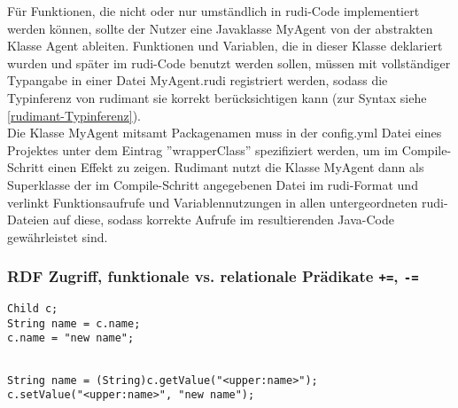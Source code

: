 Für Funktionen, die nicht oder nur umständlich in rudi-Code implementiert werden können, sollte der Nutzer eine Javaklasse MyAgent von der abstrakten Klasse Agent ableiten. Funktionen und Variablen, die in dieser Klasse deklariert wurden und später im rudi-Code benutzt werden sollen, müssen mit vollständiger Typangabe in einer Datei MyAgent.rudi registriert werden, sodass die Typinferenz von rudimant sie korrekt berücksichtigen kann (zur Syntax siehe \ref{rudimant-Typinferenz}).\\
Die Klasse MyAgent mitsamt Packagenamen muss in der config.yml Datei eines Projektes unter dem Eintrag ''wrapperClass'' spezifiziert werden, um im Compile-Schritt einen Effekt zu zeigen. Rudimant nutzt die Klasse MyAgent dann als Superklasse der im Compile-Schritt angegebenen Datei im rudi-Format und verlinkt Funktionsaufrufe und Variablennutzungen in allen untergeordneten rudi-Dateien auf diese, sodass korrekte Aufrufe im resultierenden Java-Code gewährleistet sind.

\subsubsection{RDF Zugriff, funktionale vs. relationale Prädikate
  \texttt{+=}, \texttt{-=}}

\begin{small}
\begin{minipage}[t]{0.35\textwidth}
\begin{verbatim}
Child c;
String name = c.name;
c.name = "new name";
\end{verbatim}
\end{minipage}
\begin{minipage}[t]{0.6\textwidth}
\begin{verbatim}

String name = (String)c.getValue("<upper:name>");
c.setValue("<upper:name>", "new name");
\end{verbatim}
\end{minipage}
\end{small}
\vspace*{2ex}

